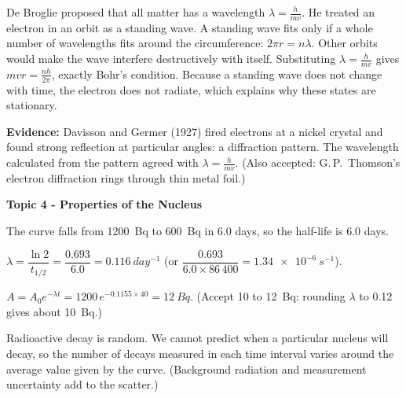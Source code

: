 \documentclass[12pt]{article}
\newcommand\anstopic[1]{\par\Needspace{8\baselineskip}\vspace{4mm}%
  \begin{center}{\headfont\bfseries\fontsize{14}{18}\selectfont #1\par}\end{center}\vspace{2pt}}
\begin{document}
\ansq
\begin{crit}
\end{crit}
\sample
De Broglie proposed that all matter has a wavelength $\lambda = \frac{h}{mv}$. He treated an electron in an
orbit as a standing wave. A standing wave fits only if a whole number of wavelengths fits around the
circumference: $2\pi r = n\lambda$. Other orbits would make the wave interfere destructively with itself.
Substituting $\lambda = \frac{h}{mv}$ gives $mvr = \frac{nh}{2\pi}$, exactly Bohr's condition. Because a
standing wave does not change with time, the electron does not radiate, which explains why these states
are stationary.

\textbf{Evidence:} Davisson and Germer (1927) fired electrons at a nickel crystal and found strong
reflection at particular angles: a diffraction pattern. The wavelength calculated from the pattern
agreed with $\lambda = \frac{h}{mv}$. (Also accepted: G.\,P.\ Thomson's electron diffraction rings through
thin metal foil.)

\anstopic{Topic 4 - Properties of the Nucleus}

\ansq
{}
\begin{crit}
\end{crit}
\sample
The curve falls from \qty{1200}{Bq} to \qty{600}{Bq} in 6.0 days, so the half-life is 6.0 days.
\begin{crit}
\end{crit}
\sample
$\lambda = \dfrac{\ln 2}{t_{1/2}} = \dfrac{0.693}{6.0} = \qty{0.116}{day^{-1}}$ (or
$\dfrac{0.693}{6.0 \times 86\,400} = \qty{1.34e-6}{s^{-1}}$).
\begin{crit}
\end{crit}
\sample
$A = A_0 e^{-\lambda t} = 1200\,e^{-0.1155 \times 40} = \qty{12}{Bq}$. (Accept 10 to \qty{12}{Bq}:
rounding $\lambda$ to 0.12 gives about \qty{10}{Bq}.)
\begin{crit}
\end{crit}
\sample
Radioactive decay is random. We cannot predict when a particular nucleus will decay, so the number of
decays measured in each time interval varies around the average value given by the curve. (Background
radiation and measurement uncertainty add to the scatter.)
\end{document}
